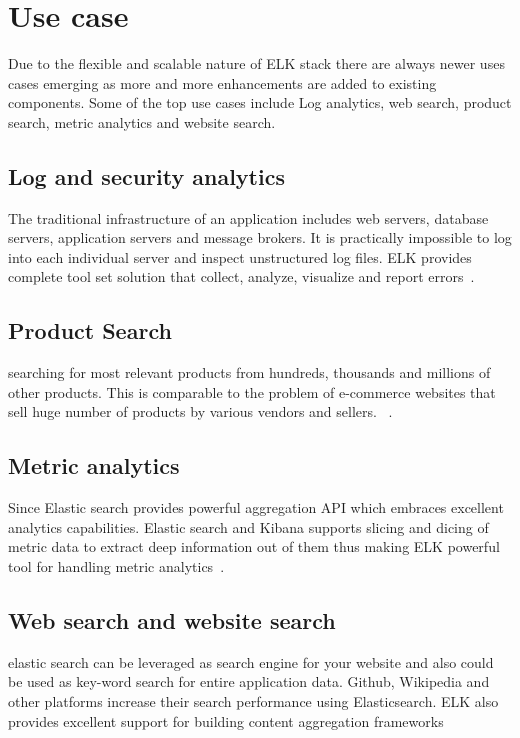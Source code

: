 \section{Use case}

Due to the flexible and scalable nature of ELK stack there are always 
newer uses cases emerging as more and more enhancements are added to existing 
components. Some of the top use cases include Log analytics, web search, 
product search, metric analytics and website search. 

\subsection{Log and security analytics}

The traditional infrastructure of an application includes web servers, database 
servers, application servers and message brokers. It is practically impossible 
to log into each individual server and inspect unstructured log files. ELK 
provides complete tool set solution that collect, analyze, visualize and report 
errors~\cite{hid-sp18-410-elk-usecase}.  

\subsection{Product Search}

searching for most relevant products from hundreds, thousands and millions of 
other products. This is comparable to the problem of e-commerce websites that 
sell huge number of products by various vendors and sellers.
~\cite{hid-sp18-410-elk-usecase}.

\subsection{Metric analytics}

Since Elastic search provides powerful aggregation API which embraces excellent 
analytics capabilities. Elastic search and Kibana supports slicing and dicing 
of metric data to extract deep information out of them thus making ELK powerful 
tool for handling metric analytics~\cite{hid-sp18-410-elk-usecase}. 


\subsection{Web search and website search}

elastic search can be leveraged as search engine for your website and
also could be used as key-word search for entire application
data. Github, Wikipedia and other platforms increase their search
performance using Elasticsearch. ELK also provides excellent support
for building content aggregation
frameworks~\cite{hid-sp18-410-elk-usecase}




